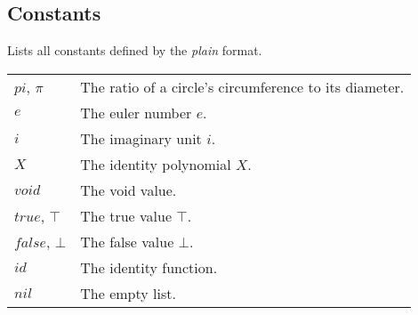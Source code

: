\documentclass[10pt]{article}
\begin{document}
    \subsection{Constants}
    Lists all constants defined by the \textit{plain} format.
    \begin{longtable}{p{}p{}}
        $ pi $, $ \pi $     & The ratio of a circle's circumference to its diameter. \\
        $ e $               & The euler number $ e $. \\
        $ i $               & The imaginary unit $ i $. \\
        $ X $               & The identity polynomial $ X $. \\
        $ void $            & The void value. \\
        $ true $, $ \top $  & The true value $ \top $. \\
        $ false $, $ \bot $ & The false value $ \bot $. \\
        $ id $              & The identity function. \\
        $ nil $             & The empty list. \\
    \end{longtable}
    
\end{document}
